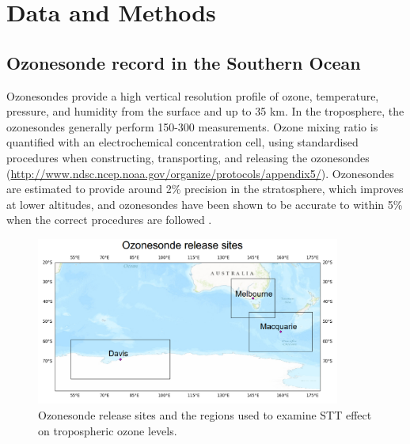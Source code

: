 \documentclass[acp, manuscript]{copernicus} %
\begin{document}
%
\section{Data and Methods}
  \label{sec:DataMethods}
  \subsection{Ozonesonde record in the Southern Ocean}
  \label{sec:ozonesondes}
    Ozonesondes provide a high vertical resolution profile of ozone, temperature, pressure, and humidity from the surface and up to 35 km.
    In the troposphere, the ozonesondes generally perform 150-300 measurements.    
    Ozone mixing ratio is quantified with an electrochemical concentration cell, using standardised procedures when constructing, transporting, and releasing the ozonesondes (\url{http://www.ndsc.ncep.noaa.gov/organize/protocols/appendix5/}).
    Ozonesondes are estimated to provide around 2\% precision in the stratosphere, which improves at lower altitudes, and ozonesondes have been shown to be accurate to within 5\% when the correct procedures are followed \citep{Smit2007}.
    
    \begin{figure}
      \includegraphics[width=10cm]{figures/ComparisonRegions.png}
      \caption{Ozonesonde release sites and the regions used to examine STT effect on tropospheric ozone levels.}
      \label{fig:ComparisonRegion}
    \end{figure}
    
\end{document}
